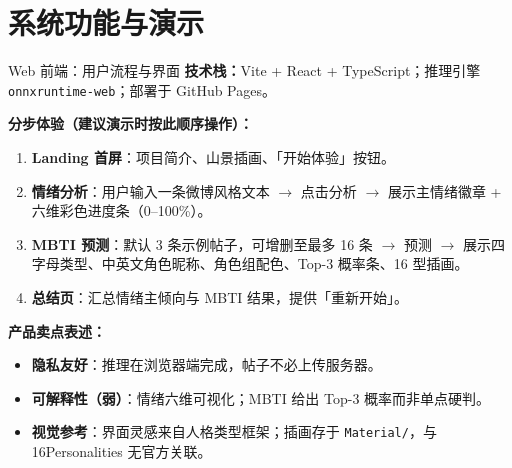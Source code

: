 \section{系统功能与演示}

\begin{frame}[allowframebreaks]{Web 前端：用户流程与界面}
    \small
    \textbf{技术栈：}Vite + React + TypeScript；推理引擎 \texttt{onnxruntime-web}；部署于 GitHub Pages。

    \vspace{0.3em}
    \textbf{分步体验（建议演示时按此顺序操作）：}
    \begin{enumerate}
        \item \textbf{Landing 首屏}：项目简介、山景插画、「开始体验」按钮。
        \item \textbf{情绪分析}：用户输入一条微博风格文本 $\to$ 点击分析 $\to$ 展示主情绪徽章 + 六维彩色进度条（0--100\%）。
        \item \textbf{MBTI 预测}：默认 3 条示例帖子，可增删至最多 16 条 $\to$ 预测 $\to$ 展示四字母类型、中英文角色昵称、角色组配色、Top-3 概率条、16 型插画。
        \item \textbf{总结页}：汇总情绪主倾向与 MBTI 结果，提供「重新开始」。
    \end{enumerate}

    \vspace{0.3em}
    \textbf{产品卖点表述：}
    \begin{itemize}
        \item \textbf{隐私友好}：推理在浏览器端完成，帖子不必上传服务器。
        \item \textbf{可解释性（弱）}：情绪六维可视化；MBTI 给出 Top-3 概率而非单点硬判。
        \item \textbf{视觉参考}：界面灵感来自人格类型框架；插画存于 \texttt{Material/}，与 16Personalities 无官方关联。
    \end{itemize}
\end{frame}

